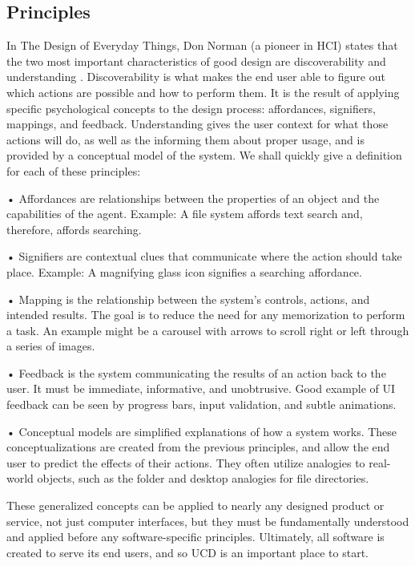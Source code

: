 \documentclass[12pt, oneside]{article}
\begin{document}
\subsection{Principles}

In The Design of Everyday Things, Don Norman (a pioneer in HCI) states that the two most important characteristics of good design are discoverability and understanding \cite[p.~3]{norman_2013}. Discoverability is what makes the end user able to figure out which actions are possible and how to perform them. It is the result of applying specific psychological concepts to the design process: affordances, signifiers, mappings, and feedback. Understanding gives the user context for what those actions will do, as well as the informing them about proper usage, and is provided by a conceptual model of the system. We shall quickly give a definition for each of these principles:

• Affordances are relationships between the properties of an object and the capabilities of the agent. Example: A file system affords text search and, therefore, affords searching.
 
• Signifiers are contextual clues that communicate where the action should take place. Example: A magnifying glass icon signifies a searching affordance.

• Mapping is the relationship between the system's controls, actions, and intended results. The goal is to reduce the need for any memorization to perform a task. An example might be a carousel with arrows to scroll right or left through a series of images.

• Feedback is the system communicating the results of an action back to the user. It must be immediate, informative, and unobtrusive. Good example of UI feedback can be seen by progress bars, input validation, and subtle animations.

• Conceptual models are simplified explanations of how a system works. These conceptualizations are created from the previous principles, and allow the end user to predict the effects of their actions. They often utilize analogies to real-world objects, such as the folder and desktop analogies for file directories.

These generalized concepts can be applied to nearly any designed product or service, not just computer interfaces, but they must be fundamentally understood and applied before any software-specific principles. Ultimately, all software is created to serve its end users, and so UCD is an important place to start.
\end{document}
